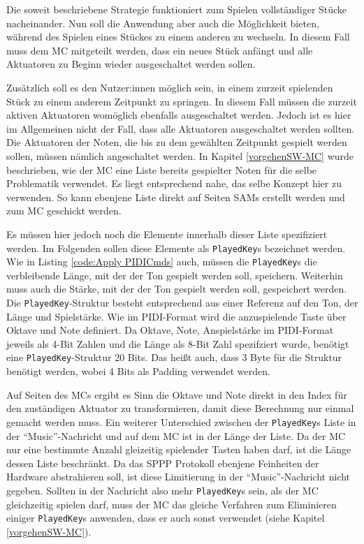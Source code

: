 Die soweit beschriebene Strategie funktioniert zum Spielen vollständiger Stücke nacheinander.
Nun soll die Anwendung aber auch die Möglichkeit bieten, während des Spielen eines Stückes zu einem anderen zu wechseln.
In diesem Fall muss dem \ac{MC} mitgeteilt werden, dass ein neues Stück anfängt und alle Aktuatoren zu Beginn wieder ausgeschaltet werden sollen.

Zusätzlich soll es den Nutzer:innen möglich sein, in einem zurzeit spielenden Stück zu einem anderem Zeitpunkt zu springen.
In diesem Fall müssen die zurzeit aktiven Aktuatoren womöglich ebenfalls ausgeschaltet werden.
Jedoch ist es hier im Allgemeinen nicht der Fall, dass alle Aktuatoren ausgeschaltet werden sollten.
Die Aktuatoren der Noten, die bis zu dem gewählten Zeitpunkt gespielt werden sollen, müssen nämlich angeschaltet werden.
In Kapitel \ref{vorgehenSW-MC} wurde beschrieben, wie der \ac{MC} eine Liste bereits gespielter Noten für die selbe Problematik verwendet.
Es liegt entsprechend nahe, das selbe Konzept hier zu verwenden.
So kann ebenjene Liste direkt auf Seiten \ac{SAM}s erstellt werden und zum \ac{MC} geschickt werden.

Es müssen hier jedoch noch die Elemente innerhalb dieser Liste spezifiziert werden.
Im Folgenden sollen diese Elemente als \lstinline|PlayedKey|s bezeichnet werden.
Wie in Listing \ref{code:Apply PIDICmds} auch, müssen die \lstinline|PlayedKey|s die verbleibende Länge, mit der der Ton gespielt werden soll, speichern.
Weiterhin muss auch die Stärke, mit der der Ton gespielt werden soll, gespeichert werden.
Die \lstinline|PlayedKey|-Struktur besteht entsprechend aus einer Referenz auf den Ton, der Länge und Spielstärke.
Wie im \ac{PIDI}-Format wird die anzuspielende Taste über Oktave und Note definiert.
Da Oktave, Note, Anspielstärke im \ac{PIDI}-Format jeweils als 4-Bit Zahlen und die Länge als 8-Bit Zahl spezifziert wurde, benötigt eine \lstinline|PlayedKey|-Struktur 20 Bits.
Das heißt auch, dass 3 Byte für die Struktur benötigt werden, wobei 4 Bits als Padding verwendet werden.

Auf Seiten des \ac{MC}s ergibt es Sinn die Oktave und Note direkt in den Index für den zuständigen Aktuator zu transformieren, damit diese Berechnung nur einmal gemacht werden muss.
Ein weiterer Unterschied zwischen der \lstinline|PlayedKey|s Liste in der \enquote{Music}-Nachricht und auf dem \ac{MC} ist in der Länge der Liste.
Da der \ac{MC} nur eine bestimmte Anzahl gleizeitig spielender Tasten haben darf, ist die Länge dessen Liste beschränkt.
Da das \ac{SPPP} Protokoll ebenjene Feinheiten der Hardware abstrahieren soll, ist diese Limitierung in der \enquote{Music}-Nachricht nicht gegeben.
Sollten in der Nachricht also mehr \lstinline|PlayedKey|s sein, als der \ac{MC} gleichzeitig spielen darf, muss der \ac{MC} das gleiche Verfahren zum Eliminieren einiger \lstinline|PlayedKey|s anwenden, dass er auch sonst verwendet (siehe Kapitel \ref{vorgehenSW-MC}).

